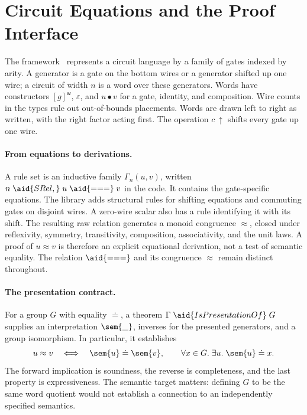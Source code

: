 \section{Circuit Equations and the Proof Interface}\label{sec:framework}

The framework~\cite{bian2026framework} represents a circuit language by
a family of gates indexed by arity.  A generator is a gate on the bottom
wires or a generator shifted up one wire; a circuit of width $n$ is a
word over these generators.  Words have constructors $[g]^{\mathsf w}$,
$\varepsilon$, and $u\bullet v$ for a gate, identity, and composition.
Wire counts in the types rule out out-of-bounds placements.  Words are
drawn left to right as written, with the right factor acting first.
The operation $c\,{\uparrow}$ shifts every gate up one wire.

\paragraph{From equations to derivations.}
A rule set is an inductive family $\Gamma_n(u,v)$, written
$n\;\aid{SRel,}\;u\;\aid{===}\;v$ in the code.  It contains the
gate-specific equations.  The library adds structural rules for shifting
equations and commuting gates on disjoint wires.  A zero-wire scalar
also has a rule identifying it with its shift.  The resulting raw
relation generates a monoid congruence $\approx$, closed under
reflexivity, symmetry, transitivity, composition, associativity, and
the unit laws.  A proof of $u\approx v$ is therefore an explicit
equational derivation, not a test of semantic equality.  The relation
$\aid{===}$ and its congruence $\approx$ remain distinct throughout.

\paragraph{The presentation contract.}
For a group $G$ with equality $\doteq$, a theorem
$\Gamma\;\aid{IsPresentationOf}\;G$ supplies an interpretation
$\sem{\_}$, inverses for the presented generators, and a group
isomorphism.  In particular, it establishes
\[
  u\approx v\quad\Longleftrightarrow\quad
  \sem{u}\doteq\sem{v},
  \qquad
  \forall x\in G.\;\exists u.\;\sem{u}\doteq x.
\]
The forward implication is soundness, the reverse is completeness, and
the last property is expressiveness.  The semantic target matters:
defining $G$ to be the same word quotient would not establish a connection
to an independently specified semantics.


